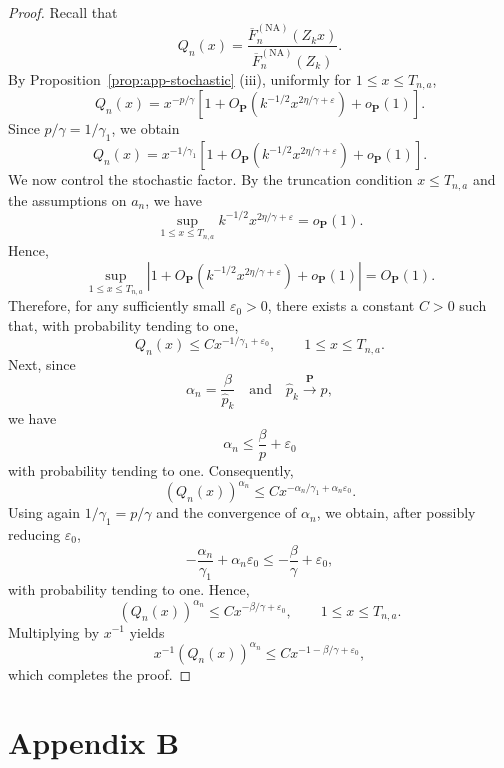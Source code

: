 \documentclass[reqno,openbib,runningheads,a4paper,12pt]{amsart}%
\begin{document}
\begin{proof}
Recall that
\[
Q_{n}(x)=\frac{\overline{F}_{n}^{(\mathrm{NA})}(Z_{k}x)}{\overline{F}%
_{n}^{(\mathrm{NA})}(Z_{k})}.
\]
By Proposition~\ref{prop:app-stochastic} (iii), uniformly for $1\leq x\leq
T_{n,a}$,
\[
Q_{n}(x)=x^{-p/\gamma}\left[  1+O_{\mathbf{P}}\!\left(  k^{-1/2}%
x^{2\eta/\gamma+\varepsilon}\right)  +o_{\mathbf{P}}(1)\right]  .
\]
Since $p/\gamma=1/\gamma_{1}$, we obtain
\[
Q_{n}(x)=x^{-1/\gamma_{1}}\left[  1+O_{\mathbf{P}}\!\left(  k^{-1/2}%
x^{2\eta/\gamma+\varepsilon}\right)  +o_{\mathbf{P}}(1)\right]  .
\]
We now control the stochastic factor. By the truncation condition $x\leq
T_{n,a}$ and the assumptions on $a_{n}$, we have
\[
\sup_{1\leq x\leq T_{n,a}}k^{-1/2}x^{2\eta/\gamma+\varepsilon}=o_{\mathbf{P}%
}(1).
\]
Hence,
\[
\sup_{1\leq x\leq T_{n,a}}\left\vert 1+O_{\mathbf{P}}\!\left(  k^{-1/2}%
x^{2\eta/\gamma+\varepsilon}\right)  +o_{\mathbf{P}}(1)\right\vert
=O_{\mathbf{P}}(1).
\]
Therefore, for any sufficiently small $\varepsilon_{0}>0$, there exists a
constant $C>0$ such that, with probability tending to one,
\[
Q_{n}(x)\leq Cx^{-1/\gamma_{1}+\varepsilon_{0}},\qquad1\leq x\leq T_{n,a}.
\]
Next, since
\[
\alpha_{n}=\frac{\beta}{\widehat{p}_{k}}\quad\text{and}\quad\widehat{p}%
_{k}\overset{\mathbf{P}}{\longrightarrow}p,
\]
we have
\[
\alpha_{n}\leq\frac{\beta}{p}+\varepsilon_{0}%
\]
with probability tending to one. Consequently,
\[
\left(  Q_{n}(x)\right)  ^{\alpha_{n}}\leq Cx^{-\alpha_{n}/\gamma_{1}%
+\alpha_{n}\varepsilon_{0}}.
\]
Using again $1/\gamma_{1}=p/\gamma$ and the convergence of $\alpha_{n}$, we
obtain, after possibly reducing $\varepsilon_{0}$,
\[
-\frac{\alpha_{n}}{\gamma_{1}}+\alpha_{n}\varepsilon_{0}\leq-\frac{\beta
}{\gamma}+\varepsilon_{0},
\]
with probability tending to one. Hence,
\[
\left(  Q_{n}(x)\right)  ^{\alpha_{n}}\leq Cx^{-\beta/\gamma+\varepsilon_{0}%
},\qquad1\leq x\leq T_{n,a}.
\]
Multiplying by $x^{-1}$ yields
\[
x^{-1}\left(  Q_{n}(x)\right)  ^{\alpha_{n}}\leq Cx^{-1-\beta/\gamma
+\varepsilon_{0}},
\]
which completes the proof.\newpage
\end{proof}

\section{\textbf{Appendix B \label{Appendix B}}}%
\end{document}
